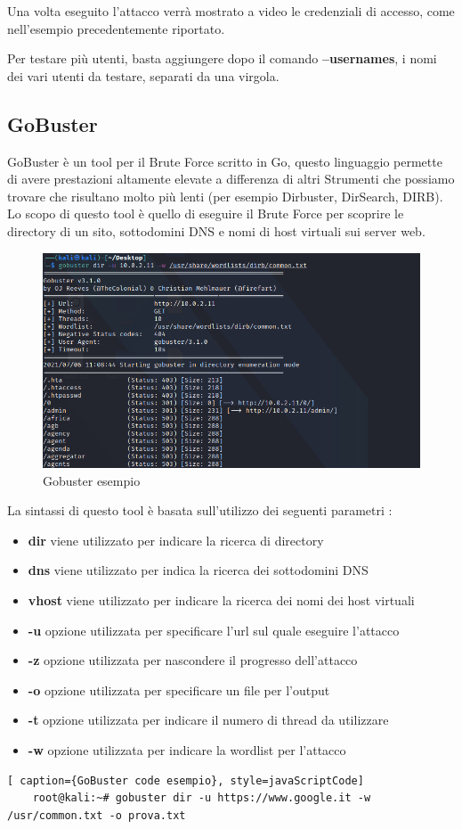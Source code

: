 Una volta eseguito l'attacco verrà mostrato a video le credenziali di accesso, come nell'esempio precedentemente riportato.

Per testare più utenti, basta aggiungere dopo il comando \textbf{--usernames}, i nomi dei vari utenti da testare, separati da una virgola.

\newpage


\subsection{GoBuster}

GoBuster\cite{gobuster} è un tool per il Brute Force scritto in Go, questo linguaggio permette di avere prestazioni altamente elevate a differenza di altri Strumenti che possiamo trovare che risultano molto più lenti (per esempio Dirbuster, DirSearch, DIRB). Lo scopo di questo tool è quello di eseguire il Brute Force per scoprire le directory di un sito, sottodomini DNS e nomi di host virtuali sui server web.

\begin{figure}[htpb!]
    \centering
    \includegraphics[width=\linewidth]{Immagini/5/gobuster.png}
    \caption{Gobuster esempio}
    \label{fig:gobuster esempio}
\end{figure}

La sintassi di questo tool è basata sull'utilizzo dei seguenti parametri :
\begin{itemize}
    \item \textbf{dir} viene utilizzato per indicare la ricerca di directory
    \item \textbf{dns} viene utilizzato per indica la ricerca dei sottodomini DNS
    \item \textbf{vhost} viene utilizzato per indicare la ricerca dei nomi dei host virtuali
    \item \textbf{-u} opzione  utilizzata per specificare l'url sul quale eseguire l'attacco
    \item \textbf{-z} opzione utilizzata per nascondere il progresso dell'attacco
    \item \textbf{-o} opzione utilizzata per specificare un file per l'output 
    \item \textbf{-t} opzione utilizzata per indicare il numero di thread da utilizzare 
    \item \textbf{-w} opzione utilizzata per indicare la wordlist per l'attacco
\end{itemize}

\begin{lstlisting}[ caption={GoBuster code esempio}, style=javaScriptCode]
    root@kali:~# gobuster dir -u https://www.google.it -w /usr/common.txt -o prova.txt
\end{lstlisting}

\label{chap:conc}

